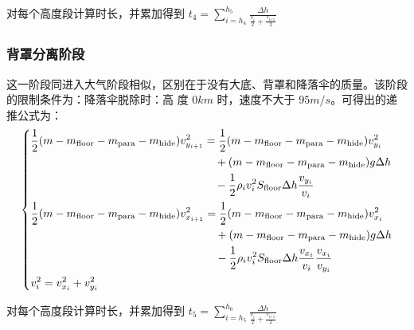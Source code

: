 \documentclass[hyperref,a4paper,UTF8]{ctexart}
\begin{document}
对每个高度段计算时长，并累加得到
$
    \displaystyle t_4=\sum_{i=h_4}^{h_5}{\displaystyle\frac{\Delta h}{\frac{\displaystyle v_i}
        {\displaystyle 2}+\frac{\displaystyle v_{\textrm{i+1}} }{\displaystyle 2}}}
$

\subsubsection{背罩分离阶段}
这一阶段同进入大气阶段相似，区别在于没有大底、背罩和降落伞的质量。该阶段的限制条件为：降落伞脱除时：高
度 $0km$ 时，速度不大于 $95m/s$。可得出的递推公式为：
\[
    \begin{dcases}
        \begin{split}
            \frac{1}{2}(m-m_{\text{floor}}-m_{\text{para}}-m_{\text{hide}})v_{y_{i + 1}}^2 &=
            \frac{1}{2}(m-m_{\text{floor}}-m_{\text{para}}-m_{\text{hide}})
            v_{y_{i}}^2 \\ &\quad + (m-m_{\text{floor}}-m_{\text{para}}-m_{\text{hide}})
            g\Delta h\\ &\quad -\frac{1}{2}\rho _iv_i^2
            S_{\text{floor}}\Delta h\frac{v_{y_i}}{v_i}
        \end{split}
        \\
        \begin{split}
            \frac{1}{2}(m-m_{\text{floor}}-m_{\text{para}}-m_{\text{hide}})v_{x_{i + 1}}^2 &=
            \frac{1}{2}(m-m_{\text{floor}}-m_{\text{para}}-m_{\text{hide}})
            v_{x_{i}}^2 \\ &\quad + (m-m_{\text{floor}}-m_{\text{para}}-m_{\text{hide}})
            g\Delta h \\ &\quad -\frac{1}{2}\rho _iv_i^2S_{\text{floor}}\Delta h
            \frac{v_{x_i}}{v_i}\frac{v_{x_i}}{v_{y_i}}
        \end{split}
        \\
        v_i^2 = v_{x_i}^2 + v_{y_i}^2
    \end{dcases}
\]

对每个高度段计算时长，并累加得到
$
    \displaystyle t_5=\sum_{i=h_5}^{h_6}{\displaystyle\frac{\Delta h}{\frac{\displaystyle v_i}
        {\displaystyle 2}+\frac{\displaystyle v_{\textrm{i+1}} }{\displaystyle 2}}}
$
\end{document}
